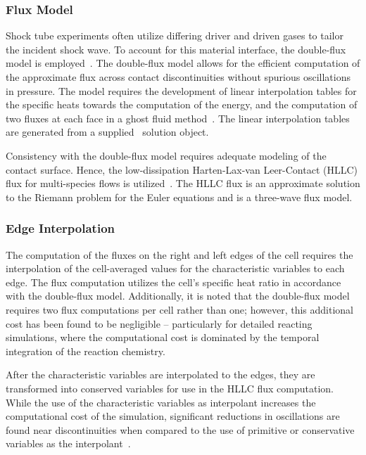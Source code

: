 \subsubsection{Flux Model}

Shock tube experiments often utilize differing driver and driven gases to tailor the incident shock wave. To account for this material interface, the double-flux model is employed~\cite{ABGRALL_JCP1996,ABGRALL_KARNI_JCP2001,BILLET_ABGRALL_JCP2003}. The double-flux model allows for the efficient computation of the approximate flux across contact discontinuities without spurious oscillations in pressure. The model requires the development of linear interpolation tables for the specific heats towards the computation of the energy, and the computation of two fluxes at each face in a ghost fluid method~\cite{GROGAN_THESIS18}. The linear interpolation tables are generated from a supplied \cantera\ solution object.

Consistency with the double-flux model requires adequate modeling of the contact surface. Hence, the low-dissipation Harten-Lax-van Leer-Contact (HLLC) flux for multi-species flows is utilized~\cite{TORO_BOOK,GROGAN_THESIS18}. The HLLC flux is an approximate solution to the Riemann problem for the Euler equations and is a three-wave flux model.
\subsubsection{Edge Interpolation}
The computation of the fluxes on the right and left edges of the cell requires the interpolation of the cell-averaged values for the characteristic variables to each edge. The flux computation utilizes the cell's specific heat ratio in accordance with the double-flux model. Additionally, it is noted that the double-flux model requires two flux computations per cell rather than one; however, this additional cost has been found to be negligible -- particularly for detailed reacting simulations, where the computational cost is dominated by the temporal integration of the reaction chemistry. 

After the characteristic variables are interpolated to the edges, they are transformed into conserved variables for use in the HLLC flux computation. While the use of the characteristic variables as interpolant increases the computational cost of the simulation, significant reductions in oscillations are found near discontinuities when compared to the use of primitive or conservative variables as the interpolant~\cite{HOUIM_KUO_JCP_2011}. 




